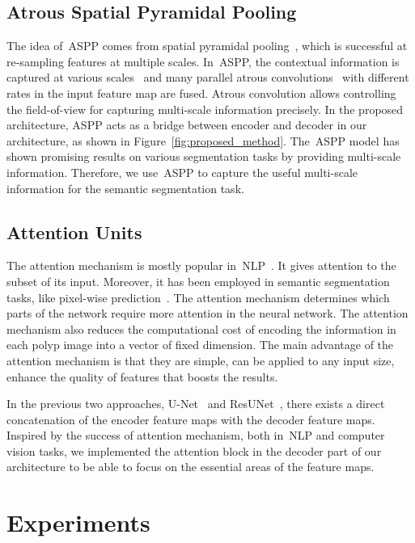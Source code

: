 \documentclass[conference]{IEEEtran}
\begin{document}
\subsection{Atrous Spatial Pyramidal Pooling}
The idea of~\ac{ASPP} comes from spatial pyramidal pooling~\cite{he2015spatial}, which is successful at re-sampling features at multiple scales. In~\ac{ASPP}, the contextual information is captured at various scales~\cite{chen2018deeplab,chen2017rethinking} and many parallel atrous convolutions~\cite{chen2017deeplab} with different rates in the input feature map are fused. Atrous convolution allows controlling the field-of-view for capturing multi-scale information precisely. In the proposed architecture, \ac{ASPP} acts as a bridge between encoder and decoder in our architecture, as shown in Figure~\ref{fig:proposed_method}. The~\ac{ASPP} model has shown promising results on various segmentation tasks by providing multi-scale information. Therefore, we use~\ac{ASPP} to capture the useful multi-scale information for the semantic segmentation task. 

\subsection{Attention Units}
The attention mechanism is mostly popular in~\ac{NLP}~\cite{vaswani2017attention}. It gives attention to the subset of its input. Moreover, it has been employed in semantic segmentation tasks, like pixel-wise prediction~\cite{li2018pyramid}. The attention mechanism determines which parts of the network require more attention in the neural network. The attention mechanism also 
reduces the computational cost of encoding 
the information in each polyp image into a vector of fixed dimension. The main advantage of the attention mechanism is that they are simple, can be applied to any input size, enhance the quality of features that boosts the results. 

In the previous two approaches, U-Net~\cite{ronneberger2015u} and ResUNet~\cite{zhang2018road}, there exists a direct concatenation of the encoder feature maps with the decoder feature maps. Inspired by the success of attention mechanism, both in~\ac{NLP} and computer vision tasks, we implemented the attention block in the decoder part of our architecture to be able to focus on the essential areas of the feature maps. 
\section{Experiments}
\label{section:Experiment}
\end{document}
